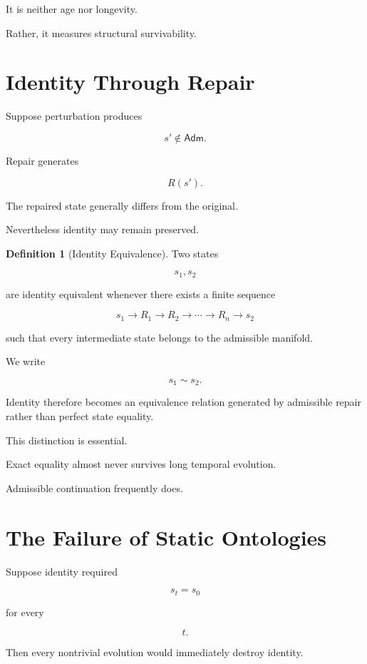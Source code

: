\documentclass[11pt,oneside]{book}
\numberwithin{equation}{chapter}
\theoremstyle{definition}
\newtheorem{definition}{Definition}[chapter]
\theoremstyle{plain}
\begin{document}
It is neither age nor longevity.

Rather, it measures structural survivability.

\section{Identity Through Repair}

Suppose perturbation produces

\[
s'
\notin
\mathsf{Adm}.
\]

Repair generates

\[
R(s').
\]

The repaired state generally differs from the original.

Nevertheless identity may remain preserved.

\begin{definition}[Identity Equivalence]

Two states

\[
s_1,s_2
\]

are identity equivalent whenever there exists a finite sequence

\[
s_1
\rightarrow
R_1
\rightarrow
R_2
\rightarrow
\cdots
\rightarrow
R_n
\rightarrow
s_2
\]

such that every intermediate state belongs to the admissible manifold.

We write

\[
s_1
\sim
s_2.
\]

\end{definition}

Identity therefore becomes an equivalence relation generated by admissible
repair rather than perfect state equality.

This distinction is essential.

Exact equality almost never survives long temporal evolution.

Admissible continuation frequently does.

\section{The Failure of Static Ontologies}

Suppose identity required

\[
s_t=s_0
\]

for every

\[
t.
\]

Then every nontrivial evolution would immediately destroy identity.
\end{document}
